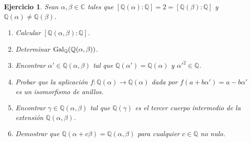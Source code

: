 \documentclass[11pt]{report}
\newcommand{\Q}{\mathbb Q}
\newcommand{\C}{\mathbb C}
\newtheorem{ejercicio}{Ejercicio}
\begin{document}
\begin{ejercicio}
    Sean $\alpha,\beta \in \C$ tales que $[\Q(\alpha) \colon \Q] = 2 = [\Q(\beta) \colon \Q]$ y $\Q(\alpha) \neq \Q(\beta)$.
    \begin{enumerate}
        \item Calcular $[\Q(\alpha,\beta) \colon \Q]$.
        \item Determinar $\textup{Gal}_\Q(\Q(\alpha,\beta))$.
        \item Encontrar $\alpha'\in \Q(\alpha,\beta)$ tal que $\Q(\alpha')=\Q(\alpha)$ y $\alpha'^2 \in \Q$.
        \item Probar que la aplicación $f \colon \Q(\alpha) \to \Q(\alpha)$ dada por $f(a+b\alpha') = a-b\alpha'$ es un isomorfismo de anillos.
        \item Encontrar $\gamma \in \Q(\alpha,\beta)$ tal que $\Q(\gamma)$ es el tercer cuerpo intermedio de la extensión $\Q(\alpha,\beta)$.
        \item Demostrar que $\Q(\alpha+c\beta) = \Q(\alpha,\beta)$ para cualquier $c \in \Q$ no nulo.
    \end{enumerate}
\end{ejercicio}
\end{document}
